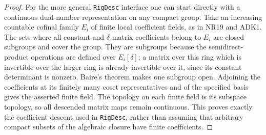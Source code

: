 \begin{proof}
For the more general \texttt{RigDesc} interface one can start
directly with a continuous dual-number representation on any compact
group.  Take an increasing countable cofinal family $E_i$ of finite
local coefficient fields, as in NR19 and ADK1.  The sets where all
constant and $\delta$ matrix coefficients belong to $E_i$ are
closed subgroups and cover the group.  They are subgroups because
the semidirect-product operations are defined over $E_i[\delta]$;
a matrix over this ring which is invertible over the larger ring
is already invertible over it, since its constant determinant is
nonzero.  Baire's theorem makes one subgroup open.  Adjoining the
coefficients at its finitely many coset representatives and of the
specified basis gives the asserted finite field.  The topology on
each finite field is its subspace topology, so all descended matrix
maps remain continuous.  This proves exactly the coefficient
descent used in \texttt{RigDesc}, rather than assuming that arbitrary
compact subsets of the algebraic closure have finite coefficients.
\end{proof}

